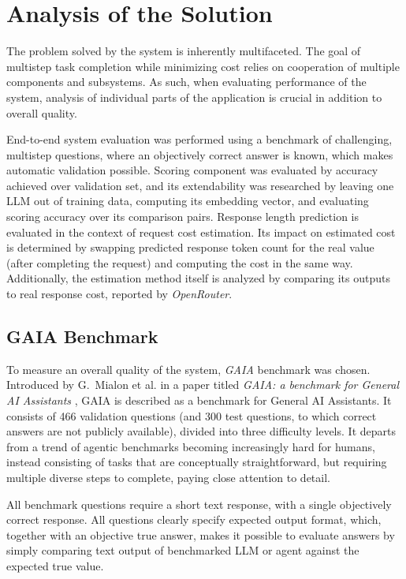 \documentclass[a4paper,11pt,twoside]{report}
\theoremstyle{definition}
\begin{document}
\chapter{Analysis of the Solution}
\label{section:solution-analysis}

The problem solved by the system is inherently multifaceted. The goal of multistep task completion while minimizing cost relies on cooperation of multiple components and subsystems. As such, when evaluating performance of the system, analysis of individual parts of the application is crucial in addition to overall quality.

End-to-end system evaluation was performed using a benchmark of challenging, multistep questions, where an objectively correct answer is known, which makes automatic validation possible. Scoring component was evaluated by accuracy achieved over validation set, and its extendability was researched by leaving one LLM out of training data, computing its embedding vector, and evaluating scoring accuracy over its comparison pairs. Response length prediction is evaluated in the context of request cost estimation. Its impact on estimated cost is determined by swapping predicted response token count for the real value (after completing the request) and computing the cost in the same way. Additionally, the estimation method itself is analyzed by comparing its outputs to real response cost, reported by \textit{OpenRouter}.  

\section{GAIA Benchmark}

To measure an overall quality of the system, \textit{GAIA} benchmark was chosen. Introduced by G.~Mialon et al. in a paper titled \textit{GAIA: a benchmark for General AI Assistants} \cite{mialon2023gaia}, GAIA is described as a benchmark for General AI Assistants. It consists of 466 validation questions (and 300 test questions, to which correct answers are not publicly available), divided into three difficulty levels. It departs from a trend of agentic benchmarks becoming increasingly hard for humans, instead consisting of tasks that are conceptually straightforward, but requiring multiple diverse steps to complete, paying close attention to detail.

All benchmark questions require a short text response, with a single objectively correct response. All questions clearly specify expected output format, which, together with an objective true answer, makes it possible to evaluate answers by simply comparing text output of benchmarked LLM or agent against the expected true value.
\end{document}
